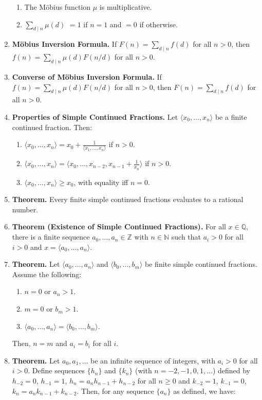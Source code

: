 \documentclass[11pt]{article}
\theoremstyle{definition}
\theoremstyle{named}
\begin{document}
\begin{enumerate}
    \begin{enumerate}
        \item The Möbius function $\mu$ is multiplicative. 
        \item $\sum_{d \mid n} \mu(d)$ $=1$ if $n=1$ and $=0$ if otherwise. 
    \end{enumerate}
    \item \textbf{Möbius Inversion Formula. } If $F(n) = \sum_{d \mid n} f(d)$ for all $n>0$, then $f(n) = \sum_{d \mid n} \mu(d)F(n/d)$ for all $n>0$. 
    \item \textbf{Converse of Möbius Inversion Formula. } If $f(n) = \sum_{d \mid n} \mu(d)F(n/d)$ for all $n>0$, then $F(n) = \sum_{d \mid n} f(d)$ for all $n>0$. 
    \item \textbf{Properties of Simple Continued Fractions. } Let $\langle x_0,\dots,x_n \rangle$ be a finite continued fraction. Then: 
    \begin{enumerate}
        \item $\langle x_0,\dots,x_n \rangle = x_0 + \frac{1}{\langle x_1,\dots, x_n \rangle}$ if $n>0$. 
        \item $\langle x_0,\dots,x_n \rangle = \langle x_0,\dots,x_{n-2},x_{n-1} + \frac{1}{x_n} \rangle$ if $n>0$. 
        \item $\langle x_0,\dots,x_n \rangle \geq x_0$, with equality iff $n=0$. 
    \end{enumerate}
    \item \textbf{Theorem. } Every finite simple continued fractions evaluates to a rational number. 
    \item \textbf{Theorem (Existence of Simple Continued Fractions). } For all $x \in \mathbb{Q}$, there is a finite sequence $a_0,\dots,a_n \in \mathbb{Z}$ with $n \in \mathbb{N}$ such that $a_i > 0$ for all $i>0$ and $x=\langle a_0,\dots,a_n \rangle$. 
    \item \textbf{Theorem. } Let $\langle a_0,\dots,a_n \rangle$ and $\langle b_0,\dots,b_m \rangle$ be finite simple continued fractions. Assume the following: 
    \begin{enumerate}
        \item $n=0$ or $a_n>1$. 
        \item $m=0$ or $b_m>1$. 
        \item $\langle a_0,\dots,a_n \rangle = \langle b_0,\dots,b_m \rangle$. 
    \end{enumerate}
    Then, $n=m$ and $a_i = b_i$ for all $i$. 
    \item \textbf{Theorem. } Let $a_0,a_1,\dots$ be an infinite sequence of integers, with $a_i > 0$ for all $i>0$. Define sequences $\{h_n\}$ and $\{k_n\}$ (with $n=-2,-1,0,1,\dots$) defined by $h_{-2} = 0$, $h_{-1} = 1$, $h_n = a_nh_{n-1} + h_{n-2}$ for all $n \geq 0$ and $k_{-2} = 1$, $k_{-1} = 0$, $k_n = a_nk_{n-1} + k_{n-2}$. Then, for any sequence $\{a_n\}$ as defined, we have: 

\end{enumerate}
\end{document}

